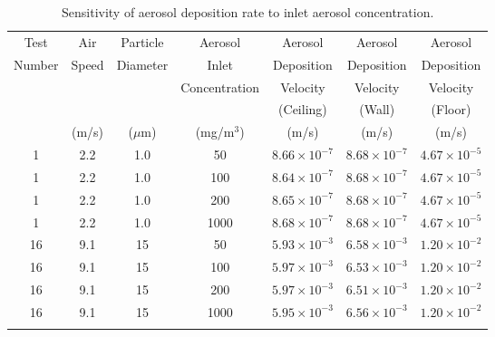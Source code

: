 \begin{table}[!ht]
\caption[Sensitivity of aerosol deposition rate to inlet aerosol concentration]
{Sensitivity of aerosol deposition rate to inlet aerosol concentration.}
\begin{tabular}{ccccccc}
\hline\noalign{\smallskip}
Test      &  Air     &  Particle  &  Aerosol        &  Aerosol                &  Aerosol                &  Aerosol                \\
Number    &  Speed   &  Diameter  &  Inlet          &  Deposition             &  Deposition             &  Deposition             \\
          &          &            &  Concentration  &  Velocity               &  Velocity               &  Velocity               \\
          &          &            &                 &  (Ceiling)              &  (Wall)                 &  (Floor)                \\
          &  (m/s)   &  ($\mu$m)  &  (mg/m$^3$)     &  (m/s)                  &  (m/s)                  &  (m/s)                  \\
\noalign{\smallskip}\hline\noalign{\smallskip}
1         &  2.2     &  1.0       &  50             &  $8.66 \times 10^{-7}$  &  $8.68 \times 10^{-7}$  &  $4.67 \times 10^{-5}$  \\
1         &  2.2     &  1.0       &  100            &  $8.64 \times 10^{-7}$  &  $8.68 \times 10^{-7}$  &  $4.67 \times 10^{-5}$  \\
1         &  2.2     &  1.0       &  200            &  $8.65 \times 10^{-7}$  &  $8.68 \times 10^{-7}$  &  $4.67 \times 10^{-5}$  \\
1         &  2.2     &  1.0       &  1000           &  $8.68 \times 10^{-7}$  &  $8.68 \times 10^{-7}$  &  $4.67 \times 10^{-5}$  \\
16        &  9.1     &  15        &  50             &  $5.93 \times 10^{-3}$  &  $6.58 \times 10^{-3}$  &  $1.20 \times 10^{-2}$  \\
16        &  9.1     &  15        &  100            &  $5.97 \times 10^{-3}$  &  $6.53 \times 10^{-3}$  &  $1.20 \times 10^{-2}$  \\
16        &  9.1     &  15        &  200            &  $5.97 \times 10^{-3}$  &  $6.51 \times 10^{-3}$  &  $1.20 \times 10^{-2}$  \\
16        &  9.1     &  15        &  1000           &  $5.95 \times 10^{-3}$  &  $6.56 \times 10^{-3}$  &  $1.20 \times 10^{-2}$  \\
\noalign{\smallskip}\hline
\end{tabular}
\label{tab:Concentration_Sensitivity}
\end{table}


